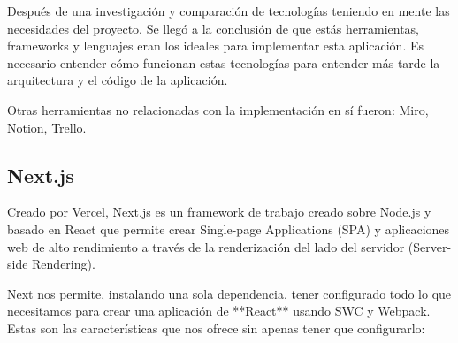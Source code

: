 \documentclass[12pt,twoside,titlepage]{report}
\begin{document}
Después de una investigación y comparación de tecnologías teniendo en mente las necesidades del proyecto. Se llegó a la conclusión de que estás herramientas, frameworks y lenguajes eran los ideales para implementar esta aplicación. Es necesario entender cómo funcionan estas tecnologías para entender más tarde la arquitectura y el código de la aplicación.

Otras herramientas no relacionadas con la implementación en sí fueron: Miro, Notion, Trello.

\subsection{Next.js}

Creado por Vercel, Next.js es un framework de trabajo creado sobre Node.js y basado en React que permite crear Single-page Applications (SPA) y aplicaciones web de alto rendimiento a través de la renderización del lado del servidor (Server-side Rendering).

Next nos permite, instalando una sola dependencia, tener configurado todo lo que necesitamos para crear una aplicación de **React** usando SWC y Webpack. Estas son las características que nos ofrece sin apenas tener que configurarlo:
\end{document}
